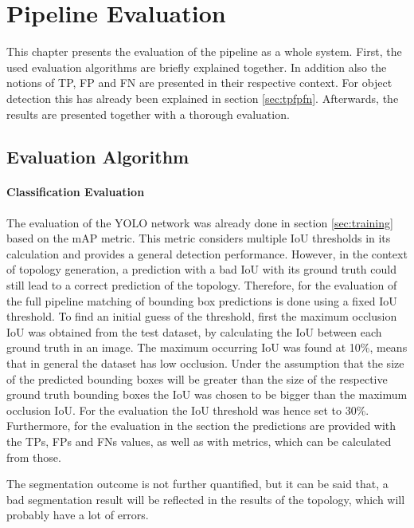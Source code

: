 \chapter{Pipeline Evaluation}

This chapter presents the evaluation of the pipeline as a whole system.
First, the used evaluation algorithms are briefly explained together.
In addition also the notions of \ac{TP}, \ac{FP} and \ac{FN} are presented in their respective context.
For object detection this has already been explained in section \ref{sec:tpfpfn}.
Afterwards, the results are presented together with a thorough evaluation.

\section{Evaluation Algorithm}
\label{sec:eval_algo}

\subsubsection{Classification Evaluation}

The evaluation of the \ac{YOLO} network was already done in section \ref{sec:training}  based on the \ac{mAP} metric.
This metric considers multiple \ac{IoU} thresholds in its calculation and provides a general detection performance.
However, in the context of topology generation, a prediction with a bad \ac{IoU} with its ground truth could still lead to a correct prediction of the topology.
Therefore, for the evaluation of the full pipeline matching of bounding box predictions is done using a fixed \ac{IoU} threshold.
To find an initial guess of the threshold, first the maximum occlusion \ac{IoU} was obtained from the test dataset, by calculating the \ac{IoU} between each ground truth in an image.
The maximum occurring \ac{IoU} was found at 10\%, means that in general the dataset has low occlusion.
Under the assumption that the size of the predicted bounding boxes will be greater than the size of the respective ground truth bounding boxes the \ac{IoU} was chosen to be bigger than the maximum occlusion \ac{IoU}.
For the evaluation the \ac{IoU} threshold was hence set to 30\%.
Furthermore, for the evaluation in the section the predictions are provided with the \acp{TP}, \acp{FP} and \acp{FN} values, as well as with metrics, which can be calculated from those.

The segmentation outcome is not further quantified, but it can be said that, a bad segmentation result will be reflected in the results of the topology, which will probably have a lot of errors.

